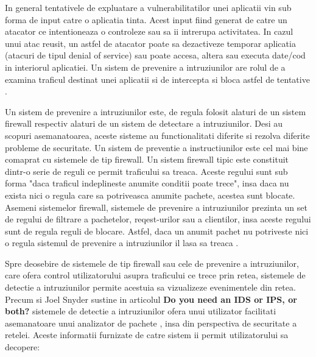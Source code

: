 In general tentativele de expluatare a vulnerabilitatilor unei aplicatii vin sub forma de input catre o aplicatia tinta. Acest input fiind generat de catre un atacator ce intentioneaza o controleze sau sa ii intrerupa activitatea. In cazul unui atac reusit, un astfel de atacator poate sa dezactiveze temporar aplicatia (atacuri de tipul denial of service) sau poate accesa, altera sau executa date/cod in interiorul aplicatiei. Un sistem de prevenire a intruziunilor are rolul de a examina traficul destinat unei aplicatii si de intercepta si bloca astfel de tentative \cite{what_is_ips}.

Un sistem de prevenire a intruziunilor este, de regula folosit alaturi de un sistem firewall respectiv alaturi de un sistem de detectare a intruziunilor. Desi au scopuri asemanatoarea, aceste sisteme au functionalitati diferite si rezolva diferite probleme de securitate. Un sistem de preventie a instructiunilor este cel mai bine comaprat cu sistemele de tip firewall. Un sistem firewall tipic este constituit dintr-o serie de reguli ce permit traficului sa treaca. Aceste regului sunt sub forma "daca traficul indeplineste anumite conditii poate trece", insa daca nu exista nici o regula care sa potriveasca anumite pachete, acestea sunt blocate. Asemeni sistemelor firewall, sistemele de prevenire a intruziunilor prezinta un set de regului de filtrare a pachetelor, reqest-urilor  sau a clientilor, insa aceste regului sunt de regula reguli de blocare. Astfel, daca un anumit pachet nu potriveste nici o regula sistemul de prevenire a intruziunilor il lasa sa treaca \cite{ips_ids}.

Spre deosebire de sistemele de tip firewall sau cele de prevenire a intruziunilor, care ofera control utilizatorului asupra traficului ce trece prin retea, sistemele de detectie a intruziunilor permite acestuia sa vizualizeze evenimentele din retea. Precum si Joel Snyder sustine in articolul \textbf{Do you need an IDS or IPS, or both?} \cite{ips_ids}  sistemele de detectie a intruziunilor ofera unui utilizator facilitati asemanatoare unui analizator de pachete \cite{net_an}, insa din perspectiva de securitate a retelei. Aceste informatii furnizate de catre sistem ii permit utilizatorului sa decopere: 
 
